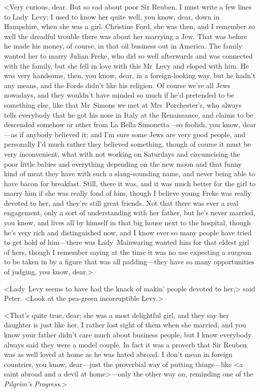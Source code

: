 <Very curious, dear. But so sad about poor Sir Reuben. I must write a few lines to Lady~Levy; I used to know her quite well, you know, dear, down in Hampshire, when she was a girl. Christine Ford, she was then, and I remember so well the dreadful trouble there was about her marrying a Jew. That was before he made his money, of course, in that oil business out in America. The family wanted her to marry Julian Freke, who did so well afterwards and was connected with the family, but she fell in love with this Mr~Levy and eloped with him. He was very handsome, then, you know, dear, in a foreign-looking way, but he hadn't any means, and the Fords didn't like his religion. Of course we're all Jews nowadays, and they wouldn't have minded so much if he'd pretended to be something else, like that Mr~Simons we met at Mrs~Porchester's, who always tells everybody that he got his nose in Italy at the Renaissance, and claims to be descended somehow or other from La Bella Simonetta—so foolish, you know, dear—as if anybody believed it; and I'm sure some Jews are very good people, and personally I'd much rather they believed something, though of course it must be very inconvenient, what with not working on Saturdays and circumcising the poor little babies and everything depending on the new moon and that funny kind of meat they have with such a slang-sounding name, and never being able to have bacon for breakfast. Still, there it was, and it was much better for the girl to marry him if she was really fond of him, though I believe young Freke was really devoted to her, and they're still great friends. Not that there was ever a real engagement, only a sort of understanding with her father, but he's never married, you know, and lives all by himself in that big house next to the hospital, though he's very rich and distinguished now, and I know ever so many people have tried to get hold of him—there was Lady~Mainwaring wanted him for that eldest girl of hers, though I remember saying at the time it was no use expecting a surgeon to be taken in by a figure that was all padding—they have so many opportunities of judging, you know, dear.>

<Lady~Levy seems to have had the knack of makin' people devoted to her,> said Peter. <Look at the pea-green incorruptible Levy.>

<That's quite true, dear; she was a most delightful girl, and they say her daughter is just like her. I rather lost sight of them when she married, and you know your father didn't care much about business people, but I know everybody always said they were a model couple. In fact it was a proverb that Sir Reuben was as well loved at home as he was hated abroad. I don't mean in foreign countries, you know, dear—just the proverbial way of putting things—like <a saint abroad and a devil at home>—only the other way on, reminding one of the \textit{Pilgrim's Progress}.>

